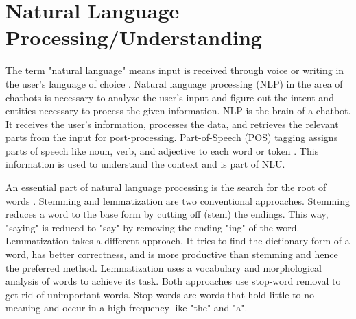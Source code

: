 \section{Natural Language Processing/Understanding}   
The term "natural language" means input is received through voice or writing in the user's language of choice \cite{buiildChatbotsPython}.
Natural language processing (NLP) in the area of chatbots is necessary to analyze the user's input and figure out the intent and entities necessary to process the given information. 
NLP is the brain of a chatbot.
It receives the user's information, processes the data, and retrieves the relevant parts from the input for post-processing.
Part-of-Speech (POS) tagging assigns parts of speech like noun, verb, and adjective to each word or token \cite{buiildChatbotsPython}.
This information is used to understand the context and is part of NLU.

An essential part of natural language processing is the search for the root of words \cite{buiildChatbotsPython}. 
Stemming and lemmatization are two conventional approaches.
Stemming reduces a word to the base form by cutting off (stem) the endings. 
This way, "saying" is reduced to "say" by removing the ending "ing" of the word.
Lemmatization takes a different approach. 
It tries to find the dictionary form of a word, has better correctness, and is more productive than stemming and hence the preferred method. 
Lemmatization uses a vocabulary and morphological analysis of words to achieve its task.
Both approaches use stop-word removal to get rid of unimportant words.
Stop words are words that hold little to no meaning and occur in a high frequency like "the" and "a".
